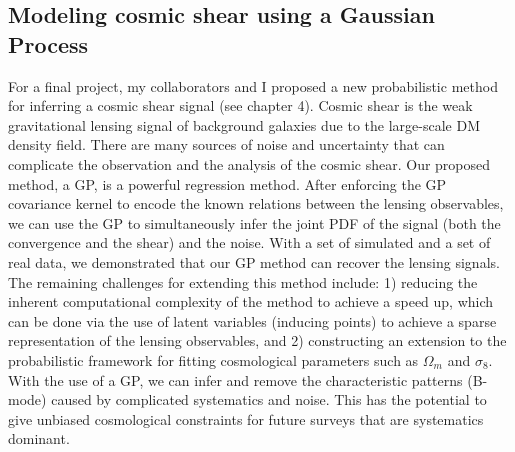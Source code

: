 
\subsection{Modeling cosmic shear using a Gaussian Process}
For a final project, my collaborators and I proposed a new probabilistic method
for inferring a cosmic shear signal (see chapter 4). 
Cosmic shear is the weak 
gravitational lensing signal of background galaxies due to the large-scale DM density field. 
There are many sources of noise and uncertainty that can complicate the observation and
the analysis of the cosmic shear. 
Our proposed method, a GP, is a powerful regression method.
After enforcing the GP covariance kernel to encode the known relations between
the lensing observables, 
we can use the GP to simultaneously infer the joint PDF of the signal (both the convergence and the shear)
and the noise.  With a set of simulated and a set of real data, we demonstrated that our GP
method can recover the lensing signals.  
The remaining challenges for extending this method include: 1) reducing the
inherent computational complexity of the method to achieve a speed up, which can
be done via the use of latent variables (inducing points) to achieve a sparse representation of
the lensing observables, and 2) constructing an 
extension to the probabilistic 
framework for fitting cosmological parameters such as $\Omega_m$ and
$\sigma_8$.  With the use of a GP, we can infer and remove the characteristic
patterns (B-mode) caused by 
complicated systematics and noise. This has the potential to give unbiased 
cosmological constraints for future surveys that are systematics dominant. 

